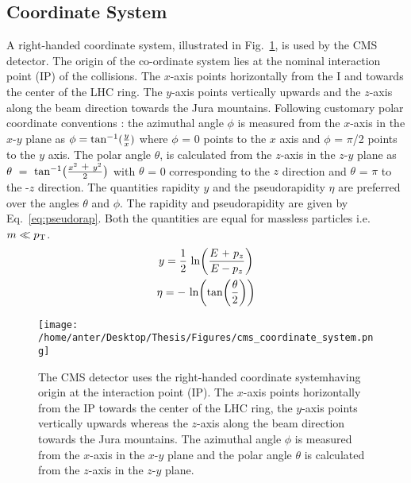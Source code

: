 \subsection{Coordinate System}
A right-handed coordinate system, illustrated in Fig.~\ref{fig:coordinate}, is used by the CMS detector. The origin of the co-ordinate system lies at the nominal interaction point (IP) of the collisions. The $x$-axis points horizontally from the I and towards the center of the LHC ring. The $y$-axis points vertically upwards and the $z$-axis along the beam direction towards the Jura mountains. %
Following customary polar coordinate conventions : the azimuthal angle $\phi$ is measured from the $x$-axis in the $x$-$y$ plane as $\phi = {\rm tan^{-1}}(\frac{y}{x})$ where $\phi$ = 0 points to the \plusn $x$ axis and $\phi$ = $\pi$/2 points to the \plusn $y$ axis. The polar angle $\theta$, is calculated from the $z$-axis in the $z$-$y$ plane as $\theta~=~{\rm tan^{-1}}\big(\frac{x^2~\plus y^2}{2}\big)$ with $\theta$ = 0 corresponding to the \plusn $z$ direction and $\theta$ = $\pi$ to the -$z$ direction. The quantities rapidity $y$ and the pseudorapidity $\eta$ are preferred over the angles $\theta$ and $\phi$. The rapidity and pseudorapidity are given by Eq.~\ref{eq:pseudorap}. Both the quantities are equal for massless particles i.e. $m \ll p_{\mathrm{T}}$.
\begin{equation}
\begin{gathered}
y = \frac{1}{2}~{\rm ln} \bigg(\frac{E~\plus p_z}{E - p_z} \bigg) \\
\eta = -~{\rm ln}\bigg({\rm tan}\bigg(\frac{\theta}{2}\bigg)\bigg)
\end{gathered}
\label{eq:pseudorap}
\end{equation}
\begin{figure}[!h]
\begin{center} 
\hspace*{-15mm}
\texttt{[image: /home/anter/Desktop/Thesis/Figures/cms\_coordinate\_system.png]}
\vspace{3mm}
\caption[The right-handed coordinate system used by the CMS detector.]{The CMS detector uses the right-handed coordinate system\footnotemark having origin at the interaction point (IP). The $x$-axis points horizontally from the IP towards the center of the LHC ring, the $y$-axis points vertically upwards whereas the $z$-axis along the beam direction towards the Jura mountains. The azimuthal angle $\phi$ is measured from the $x$-axis in the $x$-$y$ plane and the polar angle $\theta$ is calculated from the $z$-axis in the $z$-$y$ plane.}
\label{fig:coordinate}
\end{center}
\end{figure}
